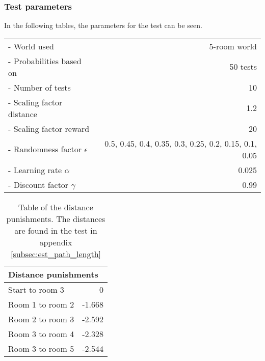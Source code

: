 \documentclass[../Head/Main.tex]{subfiles}
\begin{document}
\subsubsection{Test parameters}
In the following tables, the parameters for the test can be seen.\\
\begin{minipage}[c]{0.69\textwidth}
	\begin{tabular}{l r}
	- World used                   & 5-room world\\
	- Probabilities based on       & 50 tests\\	
	- Number of tests              & 10\\
	- Scaling factor distance      & 1.2\\
	- Scaling factor reward        & 20\\
	- Randomness factor $\epsilon$ & 0.5, 0.45, 0.4, 0.35, 0.3, 0.25, 0.2, 0.15, 0.1, 0.05\\
	- Learning rate $\alpha$       & 0.025\\
	- Discount factor $\gamma$     & 0.99\\
	\end{tabular}
\end{minipage}
\hfill
\begin{minipage}[c]{0.3\textwidth}
	\begin{table}[H]
	\centering
	\begin{tabular}{l r}
		\hline
		\multicolumn{2}{l}{\textbf{Distance punishments}}\\ 			\hline
		Start to room 3   & 0\\
		Room 1 to room 2  & -1.668\\
		Room 2 to room 3  & -2.592\\
		Room 3 to room 4  & -2.328\\
		Room 3 to room 5  & -2.544\\
		\hline
	\end{tabular}
	\caption{Table of the distance punishments. The distances are found in the test in appendix \ref{subsec:est_path_length}}
	\label{tab:distance_punishment_5_rooms_2}
\end{table}
\end{minipage}

\clearpage
\end{document}
